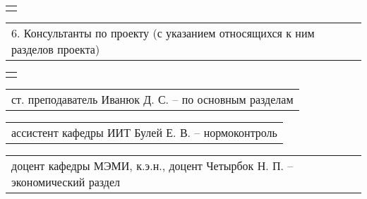 \documentclass[12pt, А4, twoside]{article}
\begin{document}
\begin{FlushLeft}
    \begin{tabular}{p{17.25cm}}
        \vspace{0pt} \hline  \\
    \end{tabular}

    \vspace{-0.1 cm}

    \begin{tabular}{p{17.25cm}}
        \textsf{6. Консультанты по проекту (с указанием относящихся к ним разделов проекта)} \vspace{0pt} \hline \\
    \end{tabular}

    \begin{tabular}{p{17.25cm}}
        \vspace{0pt} \hline \\
    \end{tabular}

    \vspace{-0.1 cm}

    \begin{tabular}{p{17.25cm}}
        \hspace{0.3cm} \textsf{ст. преподаватель Иванюк Д. С.} \hspace{4.065cm} \textsf{{--} по основным разделам} \vspace{0pt} \hline \\
    \end{tabular}

    \vspace{-0.1 cm}

    \begin{tabular}{p{17.25cm}}
        \hspace{0.3cm} \textsf{ассистент кафедры ИИТ Булей Е. В.} \hspace{3.3325cm} \textsf{{--} нормоконтроль} \vspace{0pt} \hline \\
    \end{tabular}

    \vspace{-0.1 cm}

    \begin{tabular}{p{17.25cm}}
        \hspace{0.3cm} \textsf{доцент кафедры МЭМИ, к.э.н., доцент Четырбок Н. П.} \hspace{0.5cm} \textsf{{--} экономический раздел}\vspace{0pt} \hline \\
    \end{tabular}


\end{FlushLeft}
\end{document}
